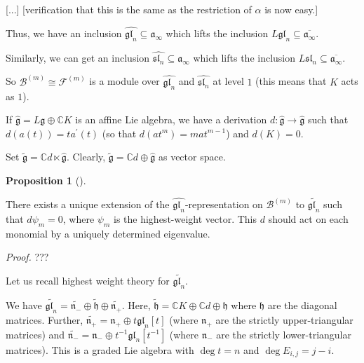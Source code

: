 \documentclass
[numbers=enddot,12pt,final,onecolumn,german,notitlepage]{scrartcl}%
\theoremstyle{definition}
\newtheorem{prop}[theo]{Proposition}
\newenvironment{proposition}[1][]
{\begin{prop}[#1]\begin{leftbar}}
{\end{leftbar}\end{prop}}
\begin{document}
[...] [verification that this is the same as the restriction of $\alpha$ is
now easy.]

Thus, we have an inclusion $\widehat{\mathfrak{gl}_{n}}\subseteq
\mathfrak{a}_{\infty}$ which lifts the inclusion $L\mathfrak{gl}_{n}%
\subseteq\overline{\mathfrak{a}_{\infty}}$.

Similarly, we can get an inclusion $\widehat{\mathfrak{sl}_{n}}\subseteq
\mathfrak{a}_{\infty}$ which lifts the inclusion $L\mathfrak{sl}_{n}%
\subseteq\overline{\mathfrak{a}_{\infty}}$.

So $\mathcal{B}^{\left(  m\right)  }\cong\mathcal{F}^{\left(  m\right)  }$ is
a module over $\widehat{\mathfrak{gl}_{n}}$ and $\widehat{\mathfrak{sl}_{n}}$
at level $1$ (this means that $K$ acts as $1$).

If $\widehat{\mathfrak{g}}=L\mathfrak{g}\oplus\mathbb{C}K$ is an affine Lie
algebra, we have a derivation $d:\widehat{\mathfrak{g}}\rightarrow
\widehat{\mathfrak{g}}$ such that $d\left(  a\left(  t\right)  \right)
=ta^{\prime}\left(  t\right)  $ (so that $d\left(  at^{m}\right)  =mat^{m-1}$)
and $d\left(  K\right)  =0$.

Set $\widetilde{\mathfrak{g}}=\mathbb{C}d\ltimes\widehat{\mathfrak{g}}$.
Clearly, $\widetilde{\mathfrak{g}}=\mathbb{C}d\oplus\widehat{\mathfrak{g}}$ as
vector space.

\begin{proposition}
There exists a unique extension of the $\widehat{\mathfrak{gl}_{n}}%
$-representation on $\mathcal{B}^{\left(  m\right)  }$ to
$\widetilde{\mathfrak{gl}_{n}}$ such that $d\psi_{m}=0$, where $\psi_{m}$ is
the highest-weight vector. This $d$ should act on each monomial by a uniquely
determined eigenvalue.
\end{proposition}

\textit{Proof.} ???

Let us recall highest weight theory for $\widetilde{\mathfrak{gl}_{n}}$.

We have $\widetilde{\mathfrak{gl}_{n}}=\widetilde{\mathfrak{n}_{-}}%
\oplus\widetilde{\mathfrak{h}}\oplus\widetilde{\mathfrak{n}_{+}}$. Here,
$\widetilde{\mathfrak{h}}=\mathbb{C}K\oplus\mathbb{C}d\oplus\mathfrak{h}$
where $\mathfrak{h}$ are the diagonal matrices. Further,
$\widetilde{\mathfrak{n}_{+}}=\mathfrak{n}_{+}\oplus t\mathfrak{gl}_{n}\left[
t\right]  $ (where $\mathfrak{n}_{+}$ are the strictly upper-triangular
matrices) and $\widetilde{\mathfrak{n}_{-}}=\mathfrak{n}_{-}\oplus
t^{-1}\mathfrak{gl}_{n}\left[  t^{-1}\right]  $ (where $\mathfrak{n}_{-}$ are
the strictly lower-triangular matrices). This is a graded Lie algebra with
$\deg t=n$ and $\deg E_{i,j}=j-i$.
\end{document}
